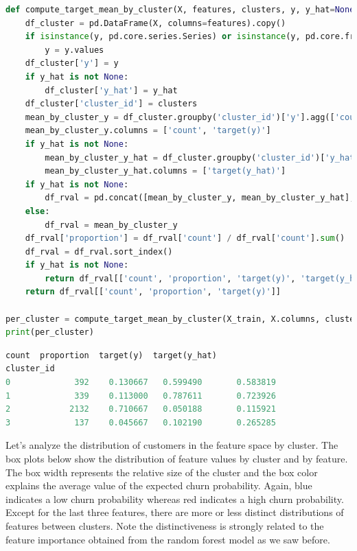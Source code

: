 \documentclass{article}
\begin{document}
\begin{lstlisting}[language=Python]
def compute_target_mean_by_cluster(X, features, clusters, y, y_hat=None):
    df_cluster = pd.DataFrame(X, columns=features).copy()
    if isinstance(y, pd.core.series.Series) or isinstance(y, pd.core.frame.DataFrame):
        y = y.values
    df_cluster['y'] = y
    if y_hat is not None:
        df_cluster['y_hat'] = y_hat
    df_cluster['cluster_id'] = clusters
    mean_by_cluster_y = df_cluster.groupby('cluster_id')['y'].agg(['count', 'mean'])
    mean_by_cluster_y.columns = ['count', 'target(y)']
    if y_hat is not None:
        mean_by_cluster_y_hat = df_cluster.groupby('cluster_id')['y_hat'].agg(['mean'])
        mean_by_cluster_y_hat.columns = ['target(y_hat)']
    if y_hat is not None:
        df_rval = pd.concat([mean_by_cluster_y, mean_by_cluster_y_hat], axis=1)
    else:
        df_rval = mean_by_cluster_y
    df_rval['proportion'] = df_rval['count'] / df_rval['count'].sum()
    df_rval = df_rval.sort_index()
    if y_hat is not None:
        return df_rval[['count', 'proportion', 'target(y)', 'target(y_hat)']]
    return df_rval[['count', 'proportion', 'target(y)']]

per_cluster = compute_target_mean_by_cluster(X_train, X.columns, clusters, y_train, y_train_pred)
print(per_cluster)
\end{lstlisting}

\begin{lstlisting}[language=Python,numbers=none]
            count  proportion  target(y)  target(y_hat)
cluster_id                                             
0             392    0.130667   0.599490       0.583819
1             339    0.113000   0.787611       0.723926
2            2132    0.710667   0.050188       0.115921
3             137    0.045667   0.102190       0.265285
\end{lstlisting}

Let’s analyze the distribution of customers in the feature space by cluster. The box plots below show the distribution of feature values by cluster and by feature. The box width represents the relative size of the cluster and the box color explains the average value of the expected churn probability. Again, blue indicates a low churn probability whereas red indicates a high churn probability. Except for the last three features, there are more or less distinct distributions of features between clusters. Note the distinctiveness is strongly related to the feature importance obtained from the random forest model as we saw before. 
\end{document}

